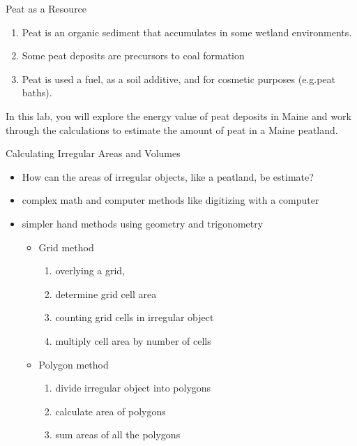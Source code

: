 \documentclass[ignorenonframetext,slidestop]{beamer}
\begin{document}
\begin{frame}{Peat as a Resource}
  \begin{enumerate}
  \item Peat is an organic sediment that accumulates in some wetland environments.
  \item Some peat deposits are precursors to coal formation
  \item Peat is used a fuel, as a soil additive, and for cosmetic purposes (e.g.peat baths).
  \end{enumerate}

  In this lab, you will explore the energy value of peat deposits in Maine and work through the calculations to estimate the amount of peat in a Maine peatland.
\end{frame}

\begin{frame}{Calculating Irregular Areas and Volumes}
  \begin{itemize}
  \item How can the areas of irregular objects, like a peatland, be estimate?
  \item complex math and computer methods like digitizing with a computer
  \item simpler hand methods using geometry and trigonometry
    \begin{itemize}
    \item Grid method
      \begin{enumerate}
      \item overlying a grid,
      \item determine grid cell area
      \item counting grid cells in irregular object
      \item multiply cell area by number of cells
      \end{enumerate}
    \item Polygon method
      \begin{enumerate}
      \item divide irregular object into polygons
      \item calculate area of polygons 
      \item sum areas of all the polygons
      \end{enumerate}
    \end{itemize}
  \end{itemize}
\end{frame}
\end{document}
